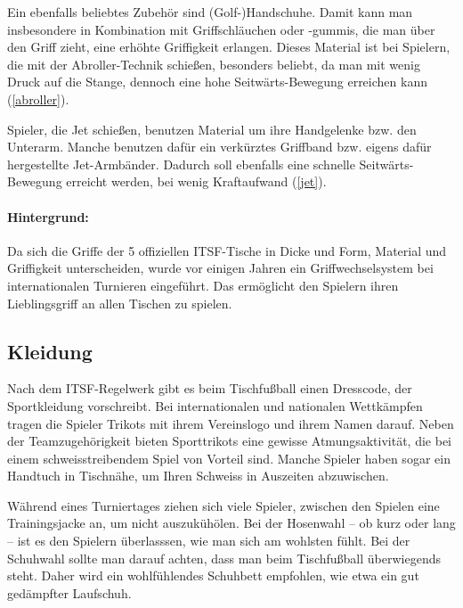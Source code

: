 Ein ebenfalls beliebtes Zubehör sind (Golf-)Handschuhe. 
Damit kann man insbesondere in Kombination mit Griffschläuchen oder -gummis, die man über den Griff zieht, eine erhöhte Griffigkeit erlangen.
Dieses Material ist bei Spielern, die mit der Abroller-Technik schießen, besonders beliebt, da man mit wenig Druck auf die Stange, dennoch eine hohe Seitwärts-Bewegung erreichen kann (\ref{abroller}).  

Spieler, die Jet schießen, benutzen Material um ihre Handgelenke bzw. den Unterarm. 
Manche benutzen dafür ein verkürztes Griffband bzw. eigens dafür hergestellte Jet-Armbänder.
Dadurch soll ebenfalls eine schnelle Seitwärts-Bewegung erreicht werden, bei wenig Kraftaufwand (\ref{jet}).



\paragraph{Hintergrund:} Da sich die Griffe der 5 offiziellen ITSF-Tische in Dicke und Form, Material und Griffigkeit unterscheiden, wurde vor einigen Jahren ein Griffwechselsystem bei internationalen Turnieren eingeführt.
Das ermöglicht den Spielern ihren Lieblingsgriff an allen Tischen zu spielen. 

\subsection{Kleidung}
\label{tisch:zubehoer:kleidung}

Nach dem ITSF-Regelwerk gibt es beim Tischfußball einen Dresscode, der Sportkleidung vorschreibt. 
Bei internationalen und nationalen Wettkämpfen tragen die Spieler Trikots mit ihrem Vereinslogo und ihrem Namen darauf. 
Neben der Teamzugehörigkeit bieten Sporttrikots eine gewisse Atmungsaktivität, die bei einem schweisstreibendem Spiel von Vorteil sind. 
Manche Spieler haben sogar ein Handtuch in Tischnähe, um Ihren Schweiss in Auszeiten abzuwischen.

Während eines Turniertages ziehen sich viele Spieler, zwischen den Spielen eine Trainingsjacke an, um nicht auszukühölen.
Bei der Hosenwahl -- ob kurz oder lang -- ist es den Spielern überlasssen, wie man sich am wohlsten fühlt. 
Bei der Schuhwahl sollte man darauf achten, dass man beim Tischfußball überwiegends steht. 
Daher wird ein wohlfühlendes Schuhbett empfohlen, wie etwa ein gut gedämpfter Laufschuh.  

